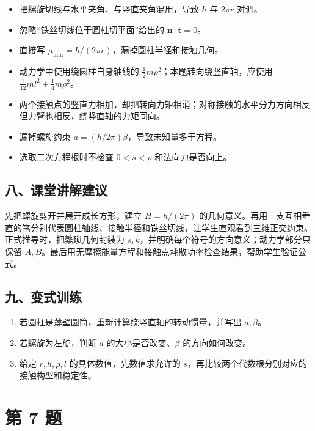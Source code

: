 \documentclass[12pt,a4paper,UTF8]{ctexart}
\newcommand{\tightlist}{\setlength{\itemsep}{0pt}\setlength{\parskip}{0pt}}
\begin{document}
\begin{itemize}
\tightlist
\item
  把螺旋切线与水平夹角、与竖直夹角混用，导致 \(h\) 与 \(2\pi r\) 对调。
\item
  忽略``铁丝切线位于圆柱切平面''给出的 \(\bm n\cdot\bm t=0\)。
\item
  直接写 \(\mu_{\min}=h/(2\pi r)\)，漏掉圆柱半径和接触几何。
\item
  动力学中使用绕圆柱自身轴线的
  \(\frac12m\rho^2\)；本题转向绕竖直轴，应使用
  \(\frac1{12}ml^2+\frac14m\rho^2\)。
\item
  两个接触点的竖直力相加，却把转向力矩相消；对称接触的水平分力方向相反但力臂也相反，绕竖直轴的力矩同向。
\item
  漏掉螺旋约束 \(a=(h/2\pi)\beta\)，导致未知量多于方程。
\item
  选取二次方程根时不检查 \(0<s<\rho\) 和法向力是否向上。
\end{itemize}

\subsection{八、课堂讲解建议}\label{ux516bux8bfeux5802ux8bb2ux89e3ux5efaux8bae-5}

先把螺旋剪开并展开成长方形，建立 \(H=h/(2\pi)\)
的几何意义。再用三支互相垂直的笔分别代表圆柱轴线、接触半径和铁丝切线，让学生直观看到三维正交约束。正式推导时，把繁琐几何封装为
\(s,k\)，并明确每个符号的方向意义；动力学部分只保留
\(A,B\)。最后用无摩擦能量方程和接触点耗散功率检查结果，帮助学生验证公式。

\subsection{九、变式训练}\label{ux4e5dux53d8ux5f0fux8badux7ec3-5}

\begin{enumerate}
\def\labelenumi{\arabic{enumi}.}
\tightlist
\item
  若圆柱是薄壁圆筒，重新计算绕竖直轴的转动惯量，并写出 \(a,\beta\)。
\item
  若螺旋为左旋，判断 \(a\) 的大小是否改变、\(\beta\) 的方向如何改变。
\item
  给定 \(r,h,\rho,l\) 的具体数值，先数值求允许的
  \(s\)，再比较两个代数根分别对应的接触构型和稳定性。
\end{enumerate}

\newpage

\section{第 7 题}\label{ux7b2c-7-ux9898}
\end{document}
